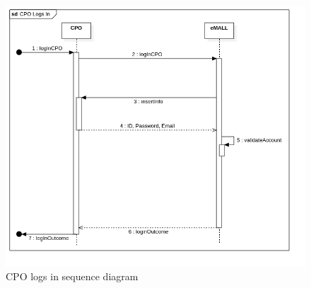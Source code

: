 \begin{center}
    \begin{figure} [H]
        \begin{center}
            \includegraphics[width=0.9\linewidth]{Images/SequenceDiagrams/cpo_logs_in}
            \caption{CPO logs in sequence diagram}
            \label{fig: cpo_log_in_seq_diag}
        \end{center}
    \end{figure}
\end{center}

